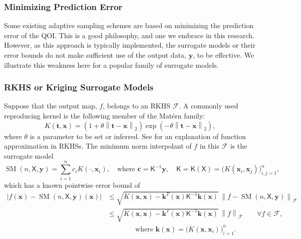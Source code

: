 \documentclass[11pt]{NSFamsart}
\DeclareMathOperator{\SURR}{SM} %
\newcommand{\mK}{\mathsf{K}}
\newcommand{\mX}{\mathsf{X}}
\newcommand{\bc}{{\boldsymbol{c}}}
\newcommand{\bx}{{\boldsymbol{x}}}
\newcommand{\bk}{{\boldsymbol{k}}}
\newcommand{\by}{{\boldsymbol{y}}}
\newcommand{\bt}{{\boldsymbol{t}}}
\newcommand{\calf}{{\mathcal{F}}}
\def\abs#1{\ensuremath{\left \lvert #1 \right \rvert}}
\newcommand{\norm}[2][{}]{\ensuremath{\left \lVert #2 \right \rVert}_{#1}}
\begin{document}
\subsubsection{Minimizing Prediction Error} \label{sec:MinPredErr}

Some existing adaptive sampling schemes are based on minimizing the prediction error of the QOI.  This is a good philosophy, and one we embrace in this research.  However, as this approach is typically implemented, the surrogate models or their error bounds do not make sufficient use of the output data, $\by$, to be effective.   We illustrate this weakness here for a popular family of surrogate models.

\subsubsection{RKHS or Kriging Surrogate Models} \label{sec:RKHSKrigSurrModel}

Suppose that the output map, $f$, belongs to an RKHS $\calf$.  A commonly used reproducing kernel is the following member of the Mat\'ern family:
\begin{equation} \label{eq:MatKer}
    K(\bt,\bx) = (1 + \theta \norm[2]{\bt-\bx}) \exp(-\theta\norm[2]{\bt-\bx}),
\end{equation}
where $\theta$ is a parameter to be set or inferred.  See \cite{Buh00, Fas07a, FasMcC15a, ForFly15a, ForEtal09, SchWen06a, Wen05a} for an explanation of function approximation in RKHSs.  The minimum norm interpolant of $f$ in this $\calf$ is the surrogate model
\begin{equation} \label{appxExOne}
    \SURR(n,\mX,\by) = \sum_{i=1}^n c_i K(\cdot, \bx_i), \quad \text{where } \bc = \mK^{-1} \by, \quad \mK = \mK(\mX) = \bigl( K(\bx_i,\bx_j) \bigr)_{i,j=1}^n, 
\end{equation}
which has a known pointwise error bound of
\begin{align}
\label{RKHSErrBd}
    \abs{f(\bx) - \SURR(n,\mX,\by)(\bx)} & \le \sqrt{K(\bx,\bx) - \bk^T(\bx) \mK^{-1} \bk(\bx)} \, \norm[\calf]{f - \SURR(n,\mX,\by)} \\
    \nonumber
    & \le \sqrt{K(\bx,\bx) - \bk^T(\bx) \mK^{-1} \bk(\bx)} \, \norm[\calf]{f} \qquad \forall f \in \calf, \\
    \nonumber
    & \qquad \qquad \text{where }  \bk(\bx) = \bigl(K(\bx,\bx_i) \bigr)_{i=1}^n.
\end{align}
\end{document}
